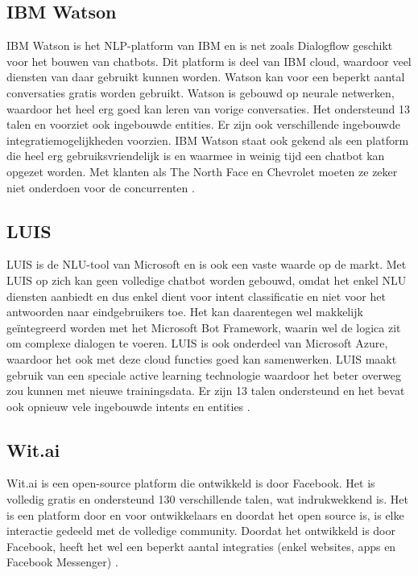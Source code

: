 \subsection{IBM Watson}
\label{subsec:nlp-platformen-ibm-watson}

IBM Watson is het NLP-platform van IBM en is net zoals Dialogflow geschikt voor het bouwen van chatbots. Dit platform is deel van IBM cloud, waardoor veel diensten van daar gebruikt kunnen worden. Watson kan voor een beperkt aantal conversaties gratis worden gebruikt. Watson is gebouwd op neurale netwerken, waardoor het heel erg goed kan leren van vorige conversaties. Het ondersteund 13 talen en voorziet ook ingebouwde entities. Er zijn ook verschillende ingebouwde integratiemogelijkheden voorzien. IBM Watson staat ook gekend als een platform die heel erg gebruiksvriendelijk is en waarmee in weinig tijd een chatbot kan opgezet worden. Met klanten als The North Face en Chevrolet moeten ze zeker niet onderdoen voor de concurrenten \autocite{IBM2020}.


\subsection{LUIS}
\label{subsec:nlp-platformen-luis} 

LUIS is de NLU-tool van Microsoft en is ook een vaste waarde op de markt. Met LUIS op zich kan geen volledige chatbot worden gebouwd, omdat het enkel NLU diensten aanbiedt en dus enkel dient voor intent classificatie en niet voor het antwoorden naar eindgebruikers toe.  Het kan daarentegen wel makkelijk geïntegreerd worden met het Microsoft Bot Framework, waarin wel de logica zit om complexe dialogen te voeren. LUIS is ook onderdeel van Microsoft Azure, waardoor het ook met deze cloud functies goed kan samenwerken. LUIS maakt gebruik van een speciale active learning technologie waardoor het beter overweg zou kunnen met nieuwe trainingsdata. Er zijn 13 talen ondersteund en het bevat ook opnieuw vele ingebouwde intents en entities \autocite{LUIS2020}.

\subsection{Wit.ai}
\label{subsec:nlp-platformen-wit.ai}

Wit.ai is een open-source platform die ontwikkeld is door Facebook. Het is volledig gratis en ondersteund 130 verschillende talen, wat indrukwekkend is. Het is een platform door en voor ontwikkelaars en doordat het open source is, is elke interactie gedeeld met de volledige community. Doordat het ontwikkeld is door Facebook, heeft het wel een beperkt aantal integraties (enkel websites, apps en Facebook Messenger) \autocite{Wit2020}.

